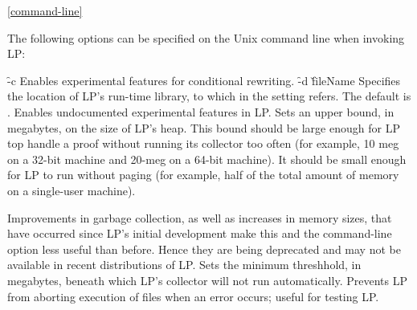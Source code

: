 \ref{command-line}

The following options can be specified on the Unix command line when invoking LP:
\begin{description}
\dt \f{-c}
\dd
Enables experimental features for conditional rewriting.
\p
\dt \f{-d} \v{fileName}
\dd
Specifies the location of LP's run-time library, to which  in the
 setting refers.  The default is .
\p
\dt {}
\dd
Enables undocumented experimental features in LP.
\p
\dt {} 
\dd
Sets an upper bound, in megabytes, on the size of LP's heap.  This bound should
be large enough for LP top handle a proof without running its collector too
often (for example, 10 meg on a 32-bit machine and 20-meg on a 64-bit machine).
It should be small enough for LP to run without paging (for example, half of
the total amount of memory on a single-user machine).

Improvements in garbage collection, as well as increases in memory sizes, that
have occurred since LP's initial development make this and the 
command-line option less useful than before.  Hence they are being deprecated
and may not be available in recent distributions of LP.  
\p
\dt {} 
\dd
Sets the minimum threshhold, in megabytes, beneath which LP's collector will
not run automatically.
\p
\dt {}
\dd
Prevents LP from aborting execution of  files when an error occurs;
useful for testing LP.
\end{description}
